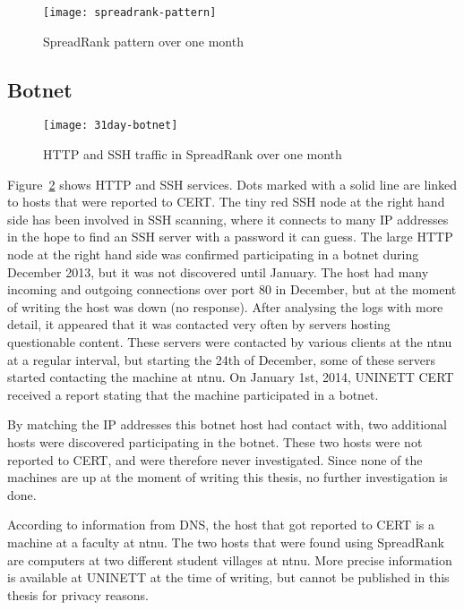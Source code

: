 \begin{figure}[h!]
	\caption{SpreadRank pattern over one month}
	\label{fig:spreadrank-pattern}
	\centering
		\texttt{[image: spreadrank-pattern]}
\end{figure}

\subsection{Botnet}
\label{ssec:botnet}

\begin{figure}[h!]
	\caption{HTTP and SSH traffic in SpreadRank over one month}
	\label{fig:31day-botnet}
	\centering
		\texttt{[image: 31day-botnet]}
\end{figure}

Figure~\ref{fig:31day-botnet} shows \gls{HTTP} and \gls{SSH} services.
Dots marked with a solid line are linked to hosts that were reported to CERT.
The tiny red SSH node at the right hand side has been involved in \gls{SSH} scanning,
 where it connects to many IP addresses in the hope to find an SSH server with a password it can guess.
The large HTTP node at the right hand side was confirmed participating in a botnet during December 2013,
 but it was not discovered until January.
The host had many incoming and outgoing connections over port 80 in December, but at the moment of writing the host was down (no response).
After analysing the logs with more detail, it appeared that it was contacted very often by servers hosting questionable content.
These servers were contacted by various clients at the \gls{ntnu} at a regular interval,
 but starting the 24th of December, some of these servers started contacting the machine at \gls{ntnu}.
On January 1st, 2014, UNINETT CERT received a report stating that the machine participated in a botnet.

By matching the IP addresses this botnet host had contact with,
 two additional hosts were discovered participating in the botnet.
These two hosts were not reported to CERT, and were therefore never investigated.
Since none of the machines are up at the moment of writing this thesis,
 no further investigation is done.

According to information from \gls{DNS}, the host that got reported to CERT is a machine at a faculty at \gls{ntnu}.
The two hosts that were found using SpreadRank are computers at two different student villages at \gls{ntnu}.
More precise information is available at UNINETT at the time of writing, but cannot be published in this thesis for privacy reasons.


